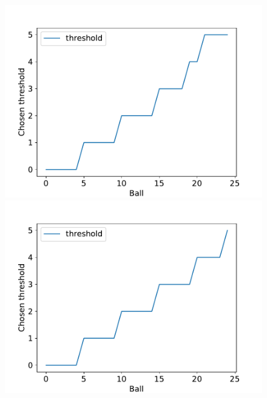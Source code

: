 \begin{figure}
\centering
\begin{minipage}[t]{.32\linewidth}
  \centering
  \includegraphics[scale=0.36]{Chapter4/Figs/dp_increasing_threshold_1.pdf}
\end{minipage}\hfill
\begin{minipage}[t]{.32\linewidth}
  \centering
  \includegraphics[scale=0.36]{Chapter4/Figs/dp_increasing_threshold_2.pdf}
\end{minipage}\hfill
\begin{minipage}[t]{.32\linewidth}
  \centering

\end{minipage}
\end{figure}
